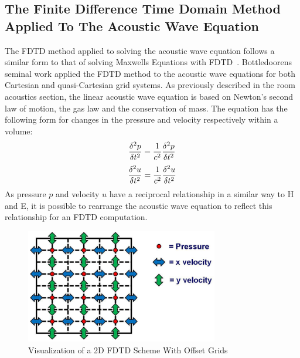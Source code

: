 \subsection{The Finite Difference Time Domain Method Applied To The Acoustic Wave Equation}
The FDTD method applied to solving the acoustic wave equation follows a similar form to that of solving Maxwells Equations with FDTD~\cite{Schneider2015}. Bottledoorens~\cite{Botteldooren1993} seminal work applied the FDTD method to the acoustic wave equations for both Cartesian and quasi-Cartesian grid systems. As previously described in the room acoustics section, the linear acoustic wave equation is based on Newton's second law of motion, the gas law and the conservation of mass. The equation has the following form for changes in the pressure and velocity respectively within a volume:\\
\begin{equation}
\frac{\delta^2 p}{\delta t^2} = \frac{1}{c^2} \frac{\delta^2 p}{\delta t^2}\\
\end{equation}
\begin{equation}
\frac{\delta^2 u}{\delta t^2} = \frac{1}{c^2} \frac{\delta^2 u}{\delta t^2}\\
\end{equation}
As pressure $p$ and velocity $u$ have a reciprocal relationship in a similar way to H and E, it is possible to rearrange the acoustic wave equation to reflect this relationship for an FDTD computation.

\begin{figure}[H]
\centering
  \includegraphics[width=0.75\textwidth]{./graphics/fdtd2dstencil.png}
  \caption{Visualization of a 2D FDTD Scheme With Offset Grids~\cite{Hill2012}}
\end{figure}

